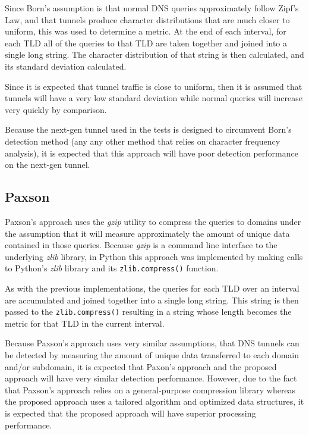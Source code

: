 \documentclass[12pt]{report}
\theoremstyle{remark}
\theoremstyle{definition}
\theoremstyle{definition}
\theoremstyle{definition}
\begin{document}
Since Born's\cite{Born2010.cfa} assumption is that normal DNS queries
approximately follow Zipf's Law, and that tunnels produce character
distributions that are much closer to uniform, this was used to determine a
metric. At the end of each interval, for each TLD all of the queries to that TLD
are taken together and joined into a single long string. The character
distribution of that string is then calculated, and its standard deviation
calculated.

Since it is expected that tunnel traffic is close to uniform, then it is assumed
that tunnels will have a very low standard deviation while normal queries will
increase very quickly by comparison.

Because the next-gen tunnel used in the tests is designed to circumvent Born's
detection method (any any other method that relies on character frequency
analysis), it is expected that this approach will have poor detection
performance on the next-gen tunnel.

\subsection{Paxson}
Paxson's\cite{Paxson2011} approach uses the \emph{gzip} utility to compress the
queries to domains under the assumption that it will measure approximately the
amount of unique data contained in those queries. Because \emph{gzip} is a
command line interface to the underlying \emph{zlib} library, in Python this
approach was implemented by making calls to Python's \emph{zlib} library and its
\texttt{zlib.compress()} function.

As with the previous implementations, the queries for each TLD over an interval
are accumulated and joined together into a single long string. This string is
then passed to the \texttt{zlib.compress()} resulting in a string whose length
becomes the metric for that TLD in the current interval.

Because Paxson's approach uses very similar assumptions, that DNS tunnels can be
detected by measuring the amount of unique data transferred to each domain
and/or subdomain, it is expected that Paxon's approach and the proposed approach
will have very similar detection performance. However, due to the fact that
Paxson's approach relies on a general-purpose compression library whereas the
proposed approach uses a tailored algorithm and optimized data structures, it is
expected that the proposed approach will have superior processing performance.
\end{document}
